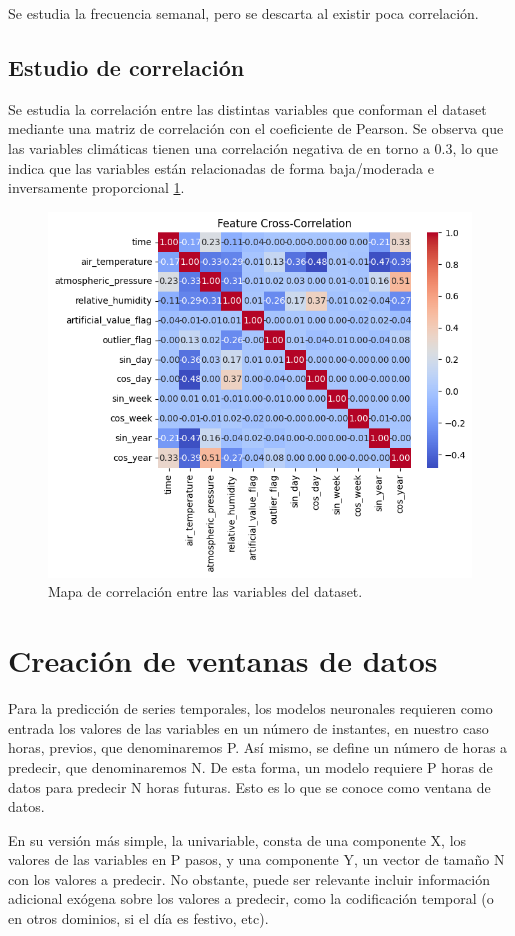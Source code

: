 Se estudia la frecuencia semanal, pero se descarta al existir poca correlación.

\subsection{Estudio de correlación}
Se estudia la correlación entre las distintas variables que conforman el dataset mediante una matriz de correlación con el coeficiente de Pearson.
Se observa que las variables climáticas tienen una correlación negativa de en torno a 0.3, lo que indica que las variables están relacionadas de 
forma baja/moderada e inversamente proporcional \ref{correlation_map}.

\begin{figure}
    \centering
    \includegraphics[width=.5\linewidth]{images/correlation_heatmap.png}
    \caption{Mapa de correlación entre las variables del dataset.}
    \label{correlation_map}
\end{figure}

\section{Creación de ventanas de datos}
Para la predicción de series temporales, los modelos neuronales requieren como entrada los valores de las variables en un número de instantes, en nuestro caso horas,
previos, que denominaremos P. Así mismo, se define un número de horas a predecir, que denominaremos N. 
De esta forma, un modelo requiere P horas de datos para predecir N horas futuras. Esto es lo que se conoce como ventana de datos.

En su versión más simple, la univariable, consta de una componente X, los valores de las variables en P pasos, y una componente Y, un vector
de tamaño N con los valores a predecir. 
No obstante, puede ser relevante incluir información adicional exógena sobre los valores a predecir, como la codificación temporal 
(o en otros dominios, si el día es festivo, etc).

